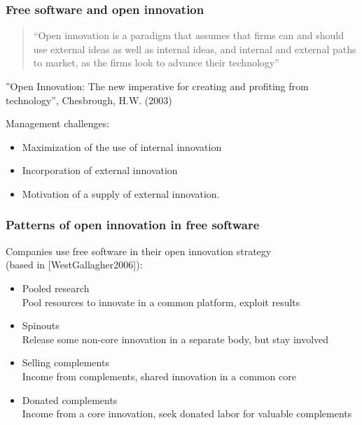 \begin{frame}
\frametitle{Free software and open innovation}

\begin{quote}
``Open innovation is a paradigm that assumes that firms can and should use external ideas as well as internal ideas, and internal and external paths to market, as the firms look to advance their technology''
\end{quote}

\begin{flushright}
''Open Innovation: The new imperative for creating and profiting from technology'', Chesbrough, H.W. (2003)
\end{flushright}

Management challenges:

\begin{itemize}
\item Maximization of the use of internal innovation
\item Incorporation of external innovation
\item Motivation of a supply of external innovation. 
\end{itemize}

\end{frame}


\begin{frame}
\frametitle{Patterns of open innovation in free software}

Companies use free software in their open innovation strategy \\
(based in [WestGallagher2006]):

\begin{itemize}
\item Pooled research \\
  Pool resources to innovate in a common platform, exploit results
\item Spinouts \\
  Release some non-core innovation in a separate body, but stay involved
\item Selling complements \\
  Income from complements, shared innovation in a common core
\item Donated complements \\
  Income from a core innovation, seek donated labor for
valuable complements
\end{itemize}

\end{frame}

